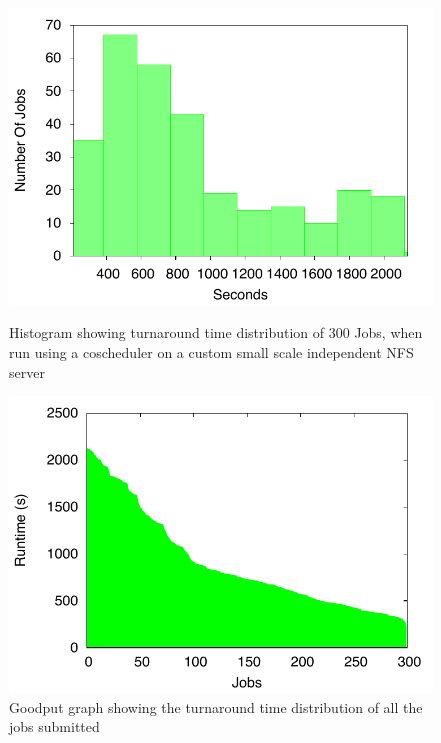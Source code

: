 \documentclass[ms,electronic,double]{nuthesis}
\begin{document}
\begin{figure}[htbp!]
\begin{center}
\includegraphics{images/nfs_tusker_histogram}
\caption{Histogram showing turnaround time distribution of 300 Jobs, when run using a coscheduler on a custom small scale independent NFS server}
\label{fig:nfs_tusker_histogram}
\end{center}

\begin{center}
\includegraphics{images/nfs_tusker_goodput}
\caption{Goodput graph showing the turnaround time distribution of all the jobs submitted}
\label{fig:nfs_tusker_goodput}
\end{center}


\end{figure}
\FloatBarrier
\end{document}
